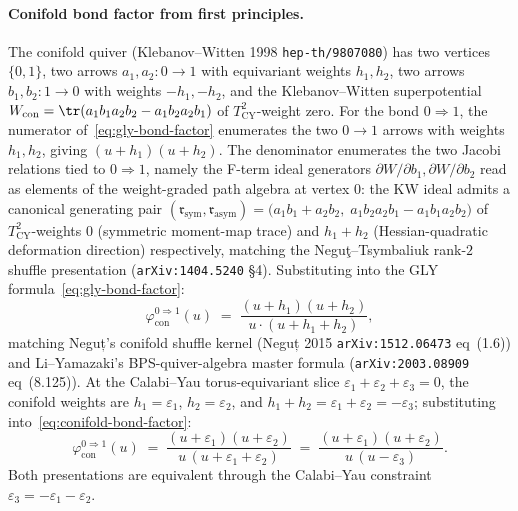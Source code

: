 \paragraph{Conifold bond factor from first principles.}
The conifold quiver (Klebanov--Witten 1998 \texttt{hep-th/9807080}) has
two vertices $\{0, 1\}$, two arrows $a_1, a_2 : 0 \to 1$ with equivariant
weights $h_1, h_2$, two arrows $b_1, b_2 : 1 \to 0$ with weights
$-h_1, -h_2$, and the Klebanov--Witten superpotential
$W_{\mathrm{con}} = \tr(a_1 b_1 a_2 b_2 - a_1 b_2 a_2 b_1)$ of
$T^2_{\mathrm{CY}}$-weight zero. For the bond $0 \Rightarrow 1$, the
numerator of~\eqref{eq:gly-bond-factor} enumerates the two $0 \to 1$
arrows with weights $h_1, h_2$, giving $(u + h_1)(u + h_2)$. The
denominator enumerates the two Jacobi relations tied to $0 \Rightarrow 1$,
namely the F-term ideal generators $\partial W / \partial b_1,
\partial W / \partial b_2$ read as elements of the weight-graded path
algebra at vertex $0$: the KW ideal admits a canonical generating pair
$(\mathfrak{r}_{\mathrm{sym}}, \mathfrak{r}_{\mathrm{asym}}) = \bigl(
a_1 b_1 + a_2 b_2, \; a_1 b_2 a_2 b_1 - a_1 b_1 a_2 b_2\bigr)$ of
$T^2_{\mathrm{CY}}$-weights $0$ (symmetric moment-map trace) and
$h_1 + h_2$ (Hessian-quadratic deformation direction) respectively,
matching the Negu\c{t}--Tsymbaliuk rank-$2$ shuffle presentation
(\texttt{arXiv:1404.5240} §4). Substituting into the GLY
formula~\eqref{eq:gly-bond-factor}:
\begin{equation}\label{eq:conifold-bond-factor}
 \varphi^{0 \Rightarrow 1}_{\mathrm{con}}(u)
 \;=\;
 \frac{(u + h_1)(u + h_2)}{u \cdot (u + h_1 + h_2)},
\end{equation}
matching Neguț's conifold shuffle kernel (Neguț 2015
\texttt{arXiv:1512.06473} eq~(1.6)) and Li--Yamazaki's
BPS-quiver-algebra master formula (\texttt{arXiv:2003.08909} eq~(8.125)).
At the Calabi--Yau torus-equivariant slice $\varepsilon_1 + \varepsilon_2
+ \varepsilon_3 = 0$, the conifold weights are $h_1 = \varepsilon_1$,
$h_2 = \varepsilon_2$, and $h_1 + h_2 = \varepsilon_1 + \varepsilon_2 =
-\varepsilon_3$; substituting into~\eqref{eq:conifold-bond-factor}:
\[
 \varphi^{0 \Rightarrow 1}_{\mathrm{con}}(u)
 \;=\;
 \frac{(u + \varepsilon_1)(u + \varepsilon_2)}{u\,(u + \varepsilon_1 + \varepsilon_2)}
 \;=\;
 \frac{(u + \varepsilon_1)(u + \varepsilon_2)}{u\,(u - \varepsilon_3)}.
\]
Both presentations are equivalent through the Calabi--Yau constraint
$\varepsilon_3 = -\varepsilon_1 - \varepsilon_2$.

